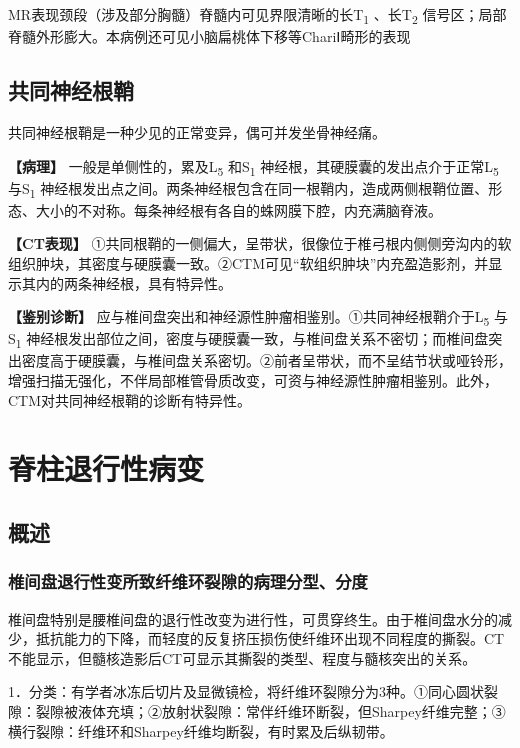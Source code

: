 MR表现颈段（涉及部分胸髓）脊髓内可见界限清晰的长T\textsubscript{1}
、长T\textsubscript{2}
信号区；局部脊髓外形膨大。本病例还可见小脑扁桃体下移等ChariⅠ畸形的表现

\subsection{共同神经根鞘}

共同神经根鞘是一种少见的正常变异，偶可并发坐骨神经痛。

\textbf{【病理】} 一般是单侧性的，累及L\textsubscript{5}
和S\textsubscript{1} 神经根，其硬膜囊的发出点介于正常L\textsubscript{5}
与S\textsubscript{1}
神经根发出点之间。两条神经根包含在同一根鞘内，造成两侧根鞘位置、形态、大小的不对称。每条神经根有各自的蛛网膜下腔，内充满脑脊液。

\textbf{【CT表现】}
①共同根鞘的一侧偏大，呈带状，很像位于椎弓根内侧侧旁沟内的软组织肿块，其密度与硬膜囊一致。②CTM可见“软组织肿块”内充盈造影剂，并显示其内的两条神经根，具有特异性。

\textbf{【鉴别诊断】}
应与椎间盘突出和神经源性肿瘤相鉴别。①共同神经根鞘介于L\textsubscript{5}
与S\textsubscript{1}
神经根发出部位之间，密度与硬膜囊一致，与椎间盘关系不密切；而椎间盘突出密度高于硬膜囊，与椎间盘关系密切。②前者呈带状，而不呈结节状或哑铃形，增强扫描无强化，不伴局部椎管骨质改变，可资与神经源性肿瘤相鉴别。此外，CTM对共同神经根鞘的诊断有特异性。

\section{脊柱退行性病变}

\subsection{概述}

\subsubsection{椎间盘退行性变所致纤维环裂隙的病理分型、分度}

椎间盘特别是腰椎间盘的退行性改变为进行性，可贯穿终生。由于椎间盘水分的减少，抵抗能力的下降，而轻度的反复挤压损伤使纤维环出现不同程度的撕裂。CT不能显示，但髓核造影后CT可显示其撕裂的类型、程度与髓核突出的关系。

1．分类：有学者冰冻后切片及显微镜检，将纤维环裂隙分为3种。①同心圆状裂隙：裂隙被液体充填；②放射状裂隙：常伴纤维环断裂，但Sharpey纤维完整；③横行裂隙：纤维环和Sharpey纤维均断裂，有时累及后纵韧带。

